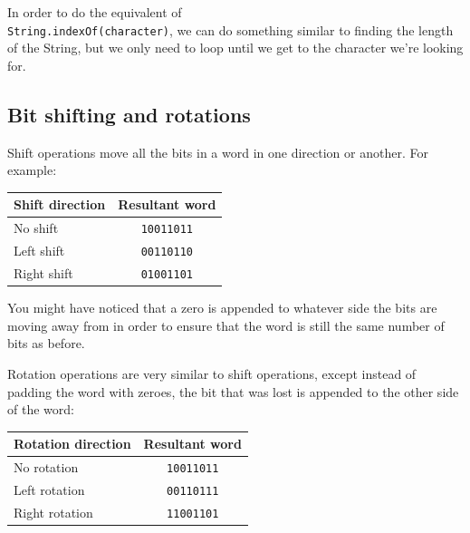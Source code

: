 In order to do the equivalent of\\{\tt String.indexOf(character)}, we can do
something similar to finding the length of the String, but we only need to loop
until we get to the character we're looking for.



\subsection{Bit shifting and rotations}

Shift operations move all the bits in a word in one direction or another. For
example:

\begin{center}
	\begin{tabular}{|l|c|}
		\hline
		{\bf Shift direction} & {\bf Resultant word}\\ \hline
		No shift & {\tt 10011011}\\ \hline
		Left shift & {\tt 00110110}\\ \hline
		Right shift & {\tt 01001101}\\ \hline
	\end{tabular}
\end{center}


You might have noticed that a zero is appended to whatever side the bits are
moving away from in order to ensure that the word is still the same number of
bits as before.

Rotation operations are very similar to shift operations, except instead of
padding the word with zeroes, the bit that was lost is appended to the other
side of the word:

\begin{center}
	\begin{tabular}{|l|c|}
		\hline
		{\bf Rotation direction} & {\bf Resultant word}\\ \hline
		No rotation & {\tt 10011011}\\ \hline
		Left rotation & {\tt 00110111}\\ \hline
		Right rotation & {\tt 11001101}\\ \hline
	\end{tabular}
\end{center}

